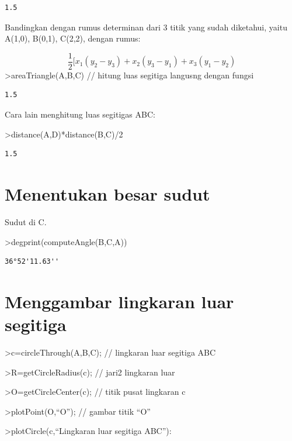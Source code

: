 \documentclass[
]{book}
\begin{document}
\begin{verbatim}
1.5
\end{verbatim}

Bandingkan dengan rumus determinan dari 3 titik yang sudah diketahui, yaitu A(1,0), B(0,1), C(2,2), dengan rumus:

\[\frac{1}{2} [x_1(y_2-y_3)+x_2(y_3-y_1)+x_3(y_1-y_2)\]\textgreater areaTriangle(A,B,C) // hitung luas segitiga langusng dengan fungsi

\begin{verbatim}
1.5
\end{verbatim}

Cara lain menghitung luas segitigas ABC:

\textgreater distance(A,D)*distance(B,C)/2

\begin{verbatim}
1.5
\end{verbatim}

\section{Menentukan besar sudut}\label{menentukan-besar-sudut}

Sudut di C.

\textgreater degprint(computeAngle(B,C,A))

\begin{verbatim}
36°52'11.63''
\end{verbatim}

\section{Menggambar lingkaran luar segitiga}\label{menggambar-lingkaran-luar-segitiga}

\textgreater c=circleThrough(A,B,C); // lingkaran luar segitiga ABC

\textgreater R=getCircleRadius(c); // jari2 lingkaran luar

\textgreater O=getCircleCenter(c); // titik pusat lingkaran c

\textgreater plotPoint(O,``O''); // gambar titik ``O''

\textgreater plotCircle(c,``Lingkaran luar segitiga ABC''):
\end{document}
